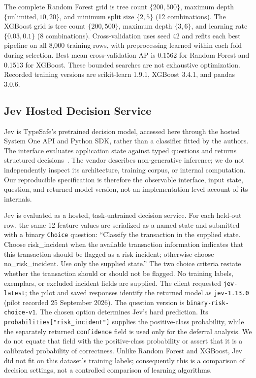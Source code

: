 \documentclass{llncs}
\begin{document}
The complete Random Forest grid is tree count $\{200,500\}$, maximum depth $\{\mathrm{unlimited},10,20\}$, and minimum split size $\{2,5\}$ (12 combinations). The XGBoost grid is tree count $\{200,500\}$, maximum depth $\{3,6\}$, and learning rate $\{0.03,0.1\}$ (8 combinations). Cross-validation uses seed 42 and refits each best pipeline on all 8,000 training rows, with preprocessing learned within each fold during selection. Best mean cross-validation AP is 0.1562 for Random Forest and 0.1513 for XGBoost. These bounded searches are not exhaustive optimization. Recorded training versions are scikit-learn 1.9.1, XGBoost 3.4.1, and pandas 3.0.6.

\subsection{Jev Hosted Decision Service}\label{sec:jev}

Jev is TypeSafe's pretrained decision model, accessed here through the hosted System One API and Python SDK, rather than a classifier fitted by the authors. The interface evaluates application state against typed questions and returns structured decisions~\cite{typesafe2026choice}. The vendor describes non-generative inference; we do not independently inspect its architecture, training corpus, or internal computation. Our reproducible specification is therefore the observable interface, input state, question, and returned model version, not an implementation-level account of its internals.

Jev is evaluated as a hosted, task-untrained decision service. For each held-out row, the same 12 feature values are serialized as a named state and submitted with a binary \texttt{Choice} question: ``Classify the transaction in the supplied state. Choose risk\_incident when the available transaction information indicates that this transaction should be flagged as a risk incident; otherwise choose no\_risk\_incident. Use only the supplied state.'' The two choice criteria restate whether the transaction should or should not be flagged. No training labels, exemplars, or excluded incident fields are supplied. The client requested \texttt{jev-latest}; the pilot and saved responses identify the returned model as \texttt{jev-1.13.0} (pilot recorded 25 September 2026). The question version is \texttt{binary-risk-choice-v1}. The chosen option determines Jev's hard prediction. Its \texttt{probabilities["risk\_incident"]} supplies the positive-class probability, while the separately returned \texttt{confidence} field is used only for the deferral analysis. We do not equate that field with the positive-class probability or assert that it is a calibrated probability of correctness. Unlike Random Forest and XGBoost, Jev did not fit on this dataset's training labels; consequently this is a comparison of decision settings, not a controlled comparison of learning algorithms.
\end{document}
